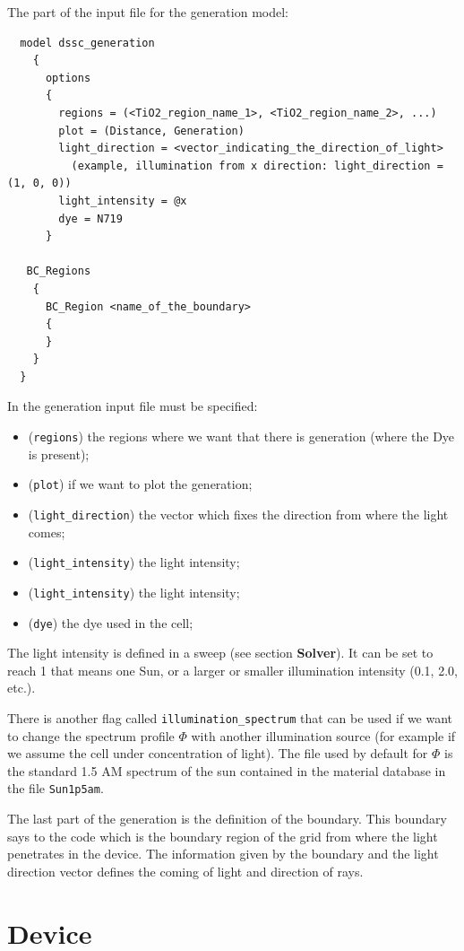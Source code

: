 The part of the input file for the generation model:
\begin{verbatim}
  model dssc_generation
    {
      options
      {
        regions = (<TiO2_region_name_1>, <TiO2_region_name_2>, ...)
        plot = (Distance, Generation)
        light_direction = <vector_indicating_the_direction_of_light>
          (example, illumination from x direction: light_direction = (1, 0, 0))
        light_intensity = @x
        dye = N719
      }

   BC_Regions
    {
      BC_Region <name_of_the_boundary>
      {
      }
    }
  }
\end{verbatim}
In the generation input file must be specified:
\begin{itemize}
    \item (\texttt{regions}) the regions where we want that there is generation (where the Dye is present);
    \item (\texttt{plot}) if we want to plot the generation;
    \item (\texttt{light\_direction}) the vector which fixes the direction from where the light comes;
    \item (\texttt{light\_intensity}) the light intensity;
    \item (\texttt{light\_intensity}) the light intensity;
    \item (\texttt{dye}) the dye used in the cell;
\end{itemize}
The light intensity is defined in a sweep (see section {\bf
Solver}). It can be set to reach 1 that means one Sun, or a larger
or smaller illumination intensity (0.1, 2.0, etc.).

There is another flag called \texttt{illumination\_spectrum} that
can be used if we want to change the spectrum profile $\Phi$ with
another illumination source (for example if we assume the cell
under concentration of light). The file used by default for $\Phi$
is the standard 1.5 AM spectrum of the sun contained in the
material database in the file \texttt{Sun1p5am}.

The last part of the generation is the definition of the boundary.
This boundary says to the code which is the boundary region of the
grid from where the light penetrates in the device. The
information given by the boundary and the light direction vector
defines the coming of light and direction of rays.

\section{Device}

